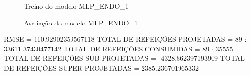 \documentclass[	12pt, Times, openright, twoside, a4paper, english, brazil]{abntex2}
\begin{document}
                \begin{figure}[!ht]
                  \caption{Treino do modelo MLP\_ENDO\_1 \label{fig:case1_mlp_endo1_train} }
                \end{figure}

                \begin{figure}[!ht]
                  \caption{Avaliação do modelo MLP\_ENDO\_1 \label{fig:case1_mlp_endo1_val} }
                \end{figure}
                RMSE = 110.92902359567118\newline
                TOTAL DE REFEIÇÕES PROJETADAS = 89 : 33611.37430477142\newline
                TOTAL DE REFEIÇÕES CONSUMIDAS = 89 : 35555\newline
                TOTAL DE REFEIÇÕES SUB PROJETADAS = -4328.862397193909\newline
                TOTAL DE REFEIÇÕES SUPER PROJETADAS = 2385.236701965332\newline

\end{document}
